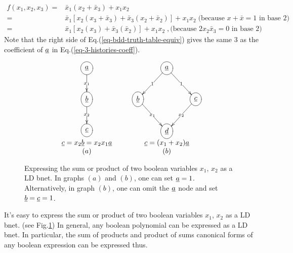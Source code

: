 \begin{align}
f(x_1, x_2,x_3) =&
\bar{x}_1(x_2+\bar{x}_3)  + x_1 x_2
\\
=&
\bar{x}_1[x_2(x_3+\bar{x}_3)+\bar{x}_3
(x_2+ \bar{x}_2)]  + x_1 x_2
\;\text{(because $x+\bar{x}=1$ in base 2)}
\\
=&
\bar{x}_1[x_2(x_3)+\bar{x}_3
(\bar{x}_2)]  + x_1 x_2\;, \text{
(because $2x_2\bar{x}_3=0$ in base 2)
}
\label{eq-bdd-truth-table-equiv}
\end{align}
Note that the right side of Eq.(\ref{eq-bdd-truth-table-equiv})
gives the same 3 
as the coefficient of $\rva$ in
 Eq.(\ref{eq-3-histories-coeff}).

\begin{figure}[h!]
$$
\begin{array}{ccc}
\xymatrix{
\Circle{\rva}
\ar[d]|{x_1}
\\
\Circle{\rvb}
\ar[d]|{x_2}
\\
\Circle{\rvc}
}
&\;\;\;&
\xymatrix{
&\Circle{\rva}\ar[dl]|1
\ar[dr]|1
\\
\Circle{\rvb}\ar[dr]|{x_1}
&&\Circle{\rvc}\ar[dl]|{x_2}
\\
&\Circle{\rvd}
}
\\
\rvc=x_2\rvb=x_2x_1\rva
&&
\rvc= (x_1 + x_2)\rva
\\
(a)&&(b)
\end{array}
$$
\caption{Expressing the sum or product
of two boolean variables $x_1$, $x_2$
as a LD bnet. In graphs $(a)$ and $(b)$,
one can set $\rva=1$. Alternatively,
in graph $(b)$, one  can
omit the $\rva$ node and set $\rvb=\rvc=1$.}
\label{fig-bdd-and-or}
\end{figure}

It's easy to  express the sum or product
of two boolean variables $x_1$, $x_2$
as a LD bnet.
(see Fig.\ref{fig-bdd-and-or})
In general, any boolean polynomial
can be expressed as a LD bnet. In particular, the sum of products and product of sums
canonical forms
of any boolean expression can be expressed
thus.
